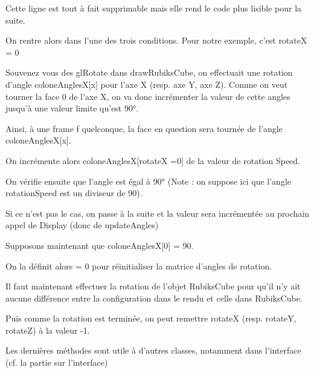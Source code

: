 Cette ligne est tout à fait supprimable mais elle rend le code plus lisible pour la suite.

On rentre alors dans l’une des trois conditions. Pour notre exemple, c’est rotateX = 0

Souvenez vous des glRotate dans drawRubiksCube, on effectuait une rotation d’angle coloneAnglesX[x] pour l’axe X (resp. axe Y, axe Z). Comme on veut tourner la face 0 de l’axe X, on va donc incrémenter la valeur de cette angles jusqu’à une valeur limite qu’est 90°.

Ainsi, à une frame f quelconque, la face en question sera tournée de l'angle coloneAnglesX[x].

On incrémente alors coloneAnglesX[rotateX =0] de la valeur de rotation Speed.

On vérifie ensuite que l’angle est égal à 90° (Note : on suppose ici que l’angle rotationSpeed est un diviseur de 90).

Si ce n’est pas le cas, on passe à la suite et la valeur sera incrémentée au prochain appel de Display (donc de updateAngles)

Supposons maintenant que coloneAnglesX[0] = 90.

On la définit alors = 0 pour réinitialiser la matrice d’angles de rotation.

Il faut maintenant effectuer la rotation de l’objet RubiksCube pour qu’il n’y ait aucune différence entre la configuration dans le rendu et celle dans RubiksCube.

Puis comme la rotation est terminée, on peut remettre rotateX (resp. rotateY, rotateZ)  à la valeur -1.

Les dernières méthodes sont utile à d’autres classes, notamment dans l’interface (cf. la partie sur l'interface)

